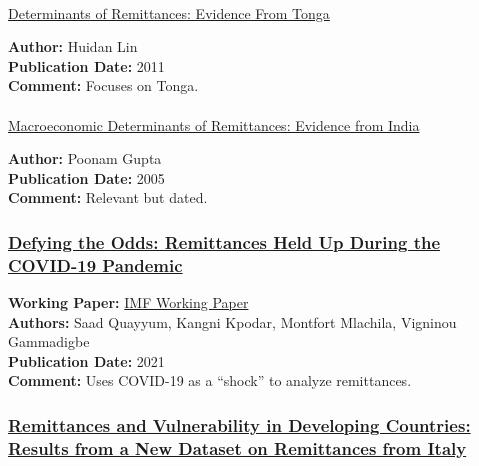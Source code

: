 \documentclass[
  11pt,
]{article}
\makeatletter
\let\oldparagraph\paragraph
\renewcommand{\paragraph}{
    \@ifstar
      \xxxParagraphStar
      \xxxParagraphNoStar
  }
\newcommand{\xxxParagraphStar}[1]{\oldparagraph*{#1}\mbox{}}
\newcommand{\xxxParagraphNoStar}[1]{\oldparagraph{#1}\mbox{}}
\makeatother
\begin{document}
\paragraph{\texorpdfstring{\href{https://www.elibrary.imf.org/view/journals/001/2011/018/article-A001-en.xml?ArticleTabs=Related\%20Documents}{Determinants
of Remittances: Evidence From
Tonga}}{Determinants of Remittances: Evidence From Tonga}}\label{determinants-of-remittances-evidence-from-tonga}

\textbf{Author:} Huidan Lin\\
\textbf{Publication Date:} 2011\\
\textbf{Comment:} Focuses on Tonga.

\paragraph{\texorpdfstring{\href{https://www.imf.org/en/Publications/WP/Issues/2016/12/31/Macroeconomic-Determinants-of-Remittances-Evidence-from-India-18728}{Macroeconomic
Determinants of Remittances: Evidence from
India}}{Macroeconomic Determinants of Remittances: Evidence from India}}\label{macroeconomic-determinants-of-remittances-evidence-from-india}

\textbf{Author:} Poonam Gupta\\
\textbf{Publication Date:} 2005\\
\textbf{Comment:} Relevant but dated.

\subsubsection{\texorpdfstring{\href{https://cepr.org/voxeu/columns/defying-odds-remittances-held-during-covid-19-pandemic}{Defying
the Odds: Remittances Held Up During the COVID-19
Pandemic}}{Defying the Odds: Remittances Held Up During the COVID-19 Pandemic}}\label{defying-the-odds-remittances-held-up-during-the-covid-19-pandemic}

\textbf{Working Paper:}
\href{https://www.imf.org/en/Publications/WP/Issues/2021/07/16/Defying-the-Odds-Remittances-During-the-COVID-19-Pandemic-461321}{IMF
Working Paper}\\
\textbf{Authors:} Saad Quayyum, Kangni Kpodar, Montfort Mlachila,
Vigninou Gammadigbe\\
\textbf{Publication Date:} 2021\\
\textbf{Comment:} Uses COVID-19 as a ``shock'' to analyze remittances.

\subsubsection{\texorpdfstring{\href{https://cepr.org/voxeu/columns/remittances-and-vulnerability-developing-countries-results-new-dataset-remittances}{Remittances
and Vulnerability in Developing Countries: Results from a New Dataset on
Remittances from
Italy}}{Remittances and Vulnerability in Developing Countries: Results from a New Dataset on Remittances from Italy}}\label{remittances-and-vulnerability-in-developing-countries-results-from-a-new-dataset-on-remittances-from-italy}
\end{document}
